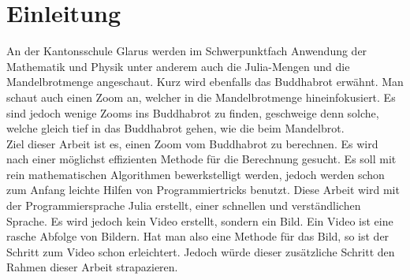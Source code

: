 \section{Einleitung}
An der Kantonsschule Glarus werden im Schwerpunktfach Anwendung der Mathematik und Physik unter anderem auch die Julia-Mengen und die Mandelbrotmenge angeschaut. Kurz wird ebenfalls das Buddhabrot erwähnt. Man schaut auch einen Zoom an, welcher in die Mandelbrotmenge hineinfokusiert. Es sind jedoch wenige Zooms ins Buddhabrot zu finden, geschweige denn solche, welche gleich tief in das Buddhabrot gehen, wie die beim Mandelbrot.\\ 
Ziel dieser Arbeit ist es, einen Zoom vom Buddhabrot zu berechnen. Es wird nach einer möglichst effizienten Methode für die Berechnung gesucht. Es soll mit rein mathematischen Algorithmen bewerkstelligt werden, jedoch werden schon zum Anfang leichte Hilfen von Programmiertricks benutzt. Diese Arbeit wird mit der Programmiersprache Julia erstellt, einer schnellen und verständlichen Sprache. Es wird jedoch kein Video erstellt, sondern ein Bild. Ein Video ist eine rasche Abfolge von Bildern. Hat man also eine Methode für das Bild, so ist der Schritt zum Video schon erleichtert. Jedoch würde dieser zusätzliche Schritt den Rahmen dieser Arbeit strapazieren.